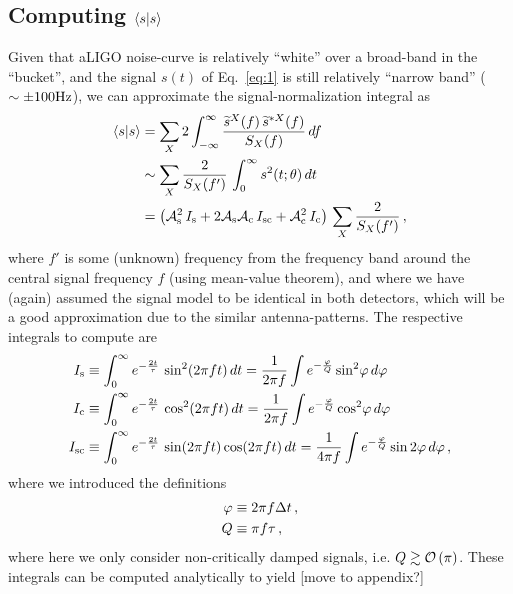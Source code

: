 \documentclass[aps,prd,onecolumn,nofootinbib,superscriptaddress,altaffilletter,floatfix]{revtex4-1}
\begin{document}
\subsection{Computing $\langle s|s\rangle$}
\label{sec:computing-scalarss}
Given that aLIGO noise-curve is relatively ``white'' over a broad-band in the ``bucket'', and the signal $s(t)$ of Eq.~\eqref{eq:1} is still
relatively ``narrow band'' ($\sim \pm 100\mathrm{Hz}$), we can approximate the signal-normalization integral as
\begin{align}
  \label{eq:17}
  \langle s|s\rangle &= \sum_X 2 \int_{-\infty}^{\infty} \frac{\widetilde{s}^X(f)\,\widetilde{s}^{*X}(f)}{S_X(f)}\,d f\\
  &\sim \sum_X \frac{2}{S_X(f')} \, \int_{0}^{\infty} s^2(t;\theta)\,dt\\
  &= \left( \mathcal{A}_{\mathrm{s}}^2\,I_{\mathrm{s}} + 2\mathcal{A}_{\mathrm{s}}\mathcal{A}_{\mathrm{c}}\,I_{\mathrm{sc}} + \mathcal{A}_{\mathrm{c}}^2\,I_{\mathrm{c}} \right)\,\sum_X \frac{2}{S_X(f')}\,,
\end{align}
where $f'$ is some (unknown) frequency from the frequency band around the central signal frequency $f$ (using mean-value theorem), and where we have
(again) assumed the signal model to be identical in both detectors, which will be a good approximation due to the similar antenna-patterns.
The respective integrals to compute are
\begin{align}
  \label{eq:18}
  I_{\mathrm{s}} &\equiv \int_0^\infty e^{-\frac{2t}{\tau}}\,\sin^2(2\pi f t)\,dt = \frac{1}{2\pi f}\int e^{-\frac{\varphi}{Q}} \sin^2\!\varphi\,d\varphi\\
  I_{\mathrm{c}} &\equiv \int_0^\infty e^{-\frac{2t}{\tau}}\,\cos^2(2\pi f t)\,dt = \frac{1}{2\pi f}\int e^{-\frac{\varphi}{Q}} \cos^2\!\varphi\,d\varphi\\
  I_{\mathrm{sc}} &\equiv \int_0^\infty e^{-\frac{2t}{\tau}}\,\sin(2\pi f t)\cos(2\pi f t)\,dt = \frac{1}{4\pi f}\int e^{-\frac{\varphi}{Q}} \sin2\varphi\,d\varphi\,,
\end{align}
where we introduced the definitions
\begin{align}
  \label{eq:3}
  \varphi &\equiv 2\pi f \Delta t\,,\\
  Q       &\equiv \pi f \tau\,,
\end{align}
where here we only consider non-critically damped signals, i.e. $Q\gtrsim \mathcal{O}\left(\pi\right)$.
These integrals can be computed analytically to yield [move to appendix?]
\end{document}
